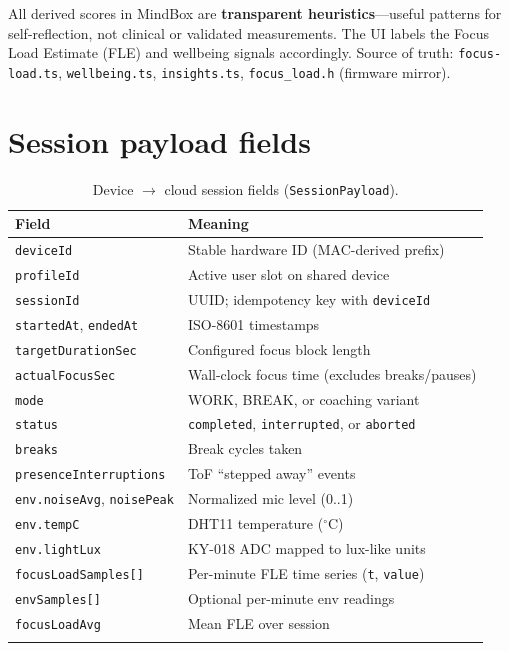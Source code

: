 \documentclass[11pt,a4paper]{report}
\newcommand{\filepath}[1]{\texttt{#1}}
\begin{document}
All derived scores in MindBox are \textbf{transparent heuristics}---useful patterns for
self-reflection, not clinical or validated measurements. The UI labels the Focus Load
Estimate (FLE) and wellbeing signals accordingly. Source of truth:
\filepath{focus-load.ts}, \filepath{wellbeing.ts}, \filepath{insights.ts},
\filepath{focus\_load.h} (firmware mirror).

\section{Session payload fields}

\begin{longtable}{@{}p{3.4cm}p{9.2cm}@{}}
\toprule
\textbf{Field} & \textbf{Meaning} \\
\midrule
\endhead
\texttt{deviceId} & Stable hardware ID (MAC-derived prefix) \\
\texttt{profileId} & Active user slot on shared device \\
\texttt{sessionId} & UUID; idempotency key with \texttt{deviceId} \\
\texttt{startedAt}, \texttt{endedAt} & ISO-8601 timestamps \\
\texttt{targetDurationSec} & Configured focus block length \\
\texttt{actualFocusSec} & Wall-clock focus time (excludes breaks/pauses) \\
\texttt{mode} & WORK, BREAK, or coaching variant \\
\texttt{status} & \texttt{completed}, \texttt{interrupted}, or \texttt{aborted} \\
\texttt{breaks} & Break cycles taken \\
\texttt{presenceInterruptions} & ToF ``stepped away'' events \\
\texttt{env.noiseAvg}, \texttt{noisePeak} & Normalized mic level (0..1) \\
\texttt{env.tempC} & DHT11 temperature ($^\circ$C) \\
\texttt{env.lightLux} & KY-018 ADC mapped to lux-like units \\
\texttt{focusLoadSamples[]} & Per-minute FLE time series (\texttt{t}, \texttt{value}) \\
\texttt{envSamples[]} & Optional per-minute env readings \\
\texttt{focusLoadAvg} & Mean FLE over session \\
\bottomrule
\caption{Device $\rightarrow$ cloud session fields (\filepath{SessionPayload}).}
\end{longtable}
\end{document}

